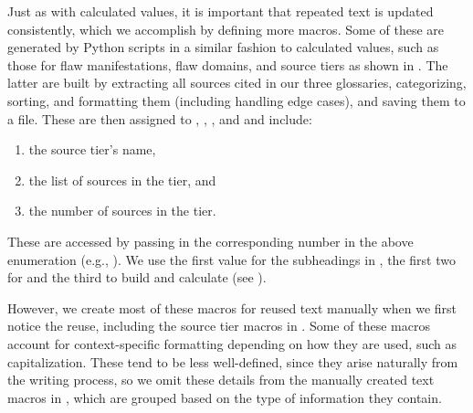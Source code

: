 \label{text-macros}
Just as with calculated values, it is important that repeated text is updated
consistently, which we accomplish by defining more macros. Some of these are
generated by Python scripts in a similar fashion to calculated values, such as
those for flaw manifestations, flaw domains, and source tiers as shown in
. The latter are built by extracting all
sources cited in our three glossaries, categorizing, sorting, and formatting
them (including handling edge cases), and saving them to a file. These are then
assigned to , , , and
 and include:
\begin{enumerate}
    \item the source tier's name,
    \item the list of sources in the tier, and
    \item the number of sources in the tier.
\end{enumerate}
These are accessed by passing in the corresponding number in the above
enumeration (e.g., ). We use the first value for the
subheadings in , the first two for  and
the third to build  and calculate 
(see ).

However, we create most of these macros for reused text manually when we first
notice the reuse, including the source tier macros in .
Some of these macros account for context-specific formatting depending on how
they are used, such as capitalization. These tend to be less well-defined,
since they arise naturally from the writing process, so we omit these details
from the manually created text macros in , which are
grouped based on the type of information they contain.

\begin{landscape}
    
\end{landscape}

